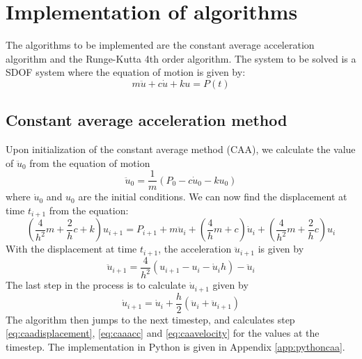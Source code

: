 \documentclass[11pt, a4paper, english, hidelinks]{NTNUoving}
\begin{document}
\tableofcontents
\section{Implementation of algorithms}
The algorithms to be implemented are the constant average acceleration algorithm and the Runge-Kutta 4th order algorithm. The system to be solved is a SDOF system where the equation of motion is given by:
\begin{equation}
	\label{eq:eqnofmotion}
	m\ddot{u} + c\dot{u} + ku = P(t)
\end{equation}
\subsection{Constant average acceleration method}
Upon initialization of the constant average method (CAA), we calculate the value of $\ddot{u}_0$ from the equation of motion
\begin{equation}
	\label{eq:eqnofmotionrewrite}
	\ddot{u}_0 = \frac{1}{m}(P_0 - c\dot{u}_0 - ku_0)
\end{equation}
where $\dot{u}_0$ and $u_0$ are the initial conditions. We can now find the displacement at time $t_{i+1}$ from the equation:
\begin{equation}
	\label{eq:caadisplacement}
	\left(\frac{4}{h^2} m + \frac{2}{h}c + k \right)u_{i+1} = P_{i+1} + m\ddot{u}_i + \left(\frac{4}{h}m + c \right) \dot{u}_i + \left(\frac{4}{h^2}m + \frac{2}{h}c\right)u_i
\end{equation}
With the displacement at time $t_{i+1}$, the acceleration $\ddot{u}_{i+1}$ is given by
\begin{equation}
	\label{eq:caaacc}
	\ddot{u}_{i+1} = \frac{4}{h^2}(u_{i+1} - u_i - \dot{u}_ih)-\ddot{u}_i
\end{equation} 
The last step in the process is to calculate $\dot{u}_{i+1}$ given by
\begin{equation}
	\label{eq:caavelocity}
	\dot{u}_{i+1} = \dot{u}_i + \frac{h}{2}(\ddot{u}_i + \ddot{u}_{i+1})
\end{equation}
The algorithm then jumps to the next timestep, and calculates step \eqref{eq:caadisplacement}, \eqref{eq:caaacc} and \eqref{eq:caavelocity} for the values at the timestep. The implementation in Python is given in Appendix \ref{app:pythoncaa}.
\end{document}

